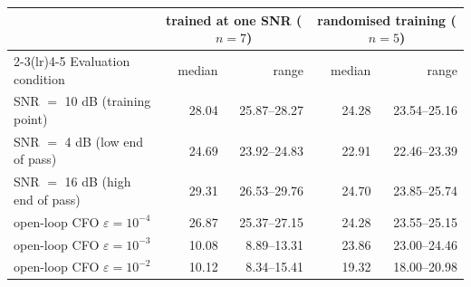 \begin{tabular}{lrrrr}
\toprule
& \multicolumn{2}{c}{trained at one SNR ($n=7$)} & \multicolumn{2}{c}{randomised training ($n=5$)} \\
\cmidrule(lr){2-3}\cmidrule(lr){4-5}
Evaluation condition & median & range & median & range \\
\midrule
SNR $=$ 10 dB (training point) & 28.04 & 25.87--28.27 & 24.28 & 23.54--25.16 \\
SNR $=$ 4 dB (low end of pass) & 24.69 & 23.92--24.83 & 22.91 & 22.46--23.39 \\
SNR $=$ 16 dB (high end of pass) & 29.31 & 26.53--29.76 & 24.70 & 23.85--25.74 \\
open-loop CFO $\varepsilon = 10^{-4}$ & 26.87 & 25.37--27.15 & 24.28 & 23.55--25.15 \\
open-loop CFO $\varepsilon = 10^{-3}$ & 10.08 & 8.89--13.31 & 23.86 & 23.00--24.46 \\
open-loop CFO $\varepsilon = 10^{-2}$ & 10.12 & 8.34--15.41 & 19.32 & 18.00--20.98 \\
\bottomrule
\end{tabular}

